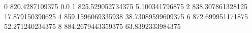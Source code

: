 0 820.4287109375 0.0
1 825.529052734375 5.100341796875
2 838.307861328125 17.879150390625
4 859.1596069335938 38.73089599609375
6 872.699951171875 52.271240234375
8 884.2679443359375 63.8392333984375
